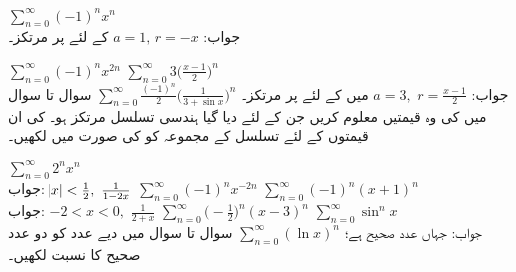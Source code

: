 $\sum\limits_{n=0}^{\infty}(-1)^nx^n$\\
جواب:\quad
$a=1,\,r=-x$\quad
{} کے لئے  پر مرتکز۔ 

$\sum\limits_{n=0}^{\infty}(-1)^nx^{2n}$
$\sum\limits_{n=0}^{\infty}3\big(\frac{x-1}{2}\big)^n$\\
جواب:\quad
$a=3,\,\,r=\tfrac{x-1}{2}$\quad
{} میں  کے لئے  پر مرتکز۔
$\sum\limits_{n=0}^{\infty}\frac{(-1)^n}{2}\big(\frac{1}{3+\sin x}\big)^n$
سوال  تا سوال  میں  کی وہ قیمتیں معلوم کریں جن کے لئے دیا گیا ہندسی تسلسل مرتکز ہو۔  کی ان قیمتوں کے لئے تسلسل کے مجموعہ کو  کی صورت میں لکھیں۔

$\sum\limits_{n=0}^{\infty}2^nx^n$\\
جواب:\quad
$\abs{x}<\tfrac{1}{2},\,\, \tfrac{1}{1-2x}$
$\sum\limits_{n=0}^{\infty}(-1)^nx^{-2n}$
$\sum\limits_{n=0}^{\infty}(-1)^n(x+1)^n$\\
جواب:\quad
$-2<x<0,\,\,\tfrac{1}{2+x}$
$\sum\limits_{n=0}^{\infty}\big(-\frac{1}{2}\big)^n(x-3)^n$
$\sum\limits_{n=0}^{\infty}\sin^n x$\\
جواب:\quad
{} جہاں  عدد صحیح ہے؛ 
$\sum\limits_{n=0}^{\infty}(\ln x)^n$
سوال  تا سوال  میں دیے عدد کو دو عدد صحیح کا نسبت لکھیں۔

